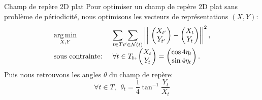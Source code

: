 \begin{frame}{Champ de repère 2D plat}
    \small
    Pour optimiser un champ de repère 2D plat sans problème de périodicité, nous optimisons 
    les vecteurs de représentations $(X, Y)$:
    \small{
    \begin{equation*}
    \begin{array}{ll}
    \underset{X, Y}{\argmin} & \underset{t \in T}{\displaystyle\sum} \underset{t' \in \mathcal{N}(t)}{\displaystyle\sum} \left|\left|\ \begin{pmatrix} X_{t'}\\ Y_{t'}\end{pmatrix} - \begin{pmatrix} X_{t}\\ Y_{t}\end{pmatrix} \right|\right|^2, \\
    \text{sous contrainte: } & \forall t \in T_b, \begin{pmatrix} X_{t}\\ Y_{t}\end{pmatrix} = \begin{pmatrix} \cos4\eta_t\\ \sin4\eta_t\end{pmatrix}.
    \end{array}
    \end{equation*}
    }
    Puis nous retrouvons les angles $\theta$ du champ de repère:
    $$ \forall t \in T,\ \  \theta_t = \frac{1}{4}\tan^{-1}\frac{Y_t}{X_t}$$

\end{frame}

